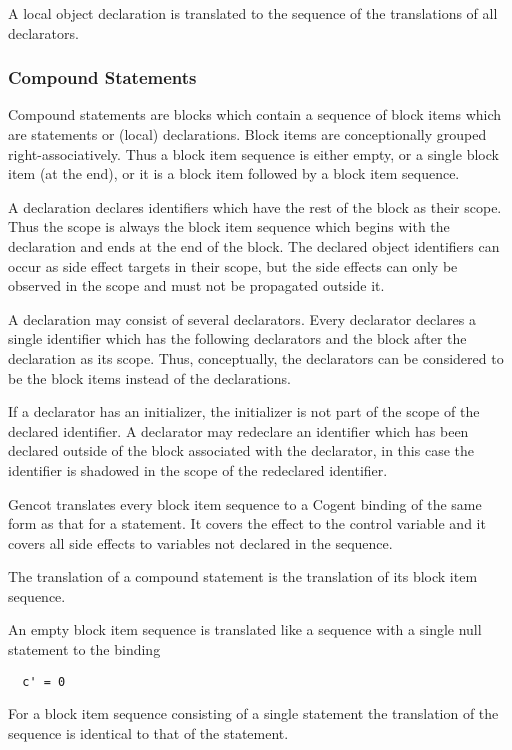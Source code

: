 A local object declaration is translated to the sequence of the translations of all declarators.

\subsubsection{Compound Statements}

Compound statements are blocks which contain a sequence of block items which are statements or (local) declarations. Block items 
are conceptionally grouped right-associatively. Thus a block item sequence is either empty, or a single block item
(at the end), or it is a block item followed by a block item sequence.

A declaration declares identifiers which have the rest of the block as their scope. Thus the scope is always the block item sequence
which begins with the declaration and ends at the end of the block. The declared object identifiers can occur as side
effect targets in their scope, but the side effects can only be observed in the scope and must not be propagated outside it.

A declaration may consist of several declarators. Every declarator declares a single identifier which has the following declarators
and the block after the declaration as its scope. Thus, conceptually, the declarators can be considered to be the block items instead
of the declarations. 

If a declarator has an initializer, the initializer is not part of the scope of the declared identifier. A declarator may redeclare 
an identifier which has been declared outside of the block associated with the declarator, in this case the identifier is shadowed
in the scope of the redeclared identifier. 

Gencot translates every block item sequence to a Cogent binding of the same form as that for a statement. It covers the effect to 
the control variable and it covers all side effects to variables not declared in the sequence. 

The translation of a compound statement is the translation of its block item sequence.

An empty block item sequence is translated like a sequence with a single null statement to the
binding
\begin{verbatim}
  c' = 0
\end{verbatim}

For a block item sequence consisting of a single statement the translation of the sequence is identical to that of the statement.

